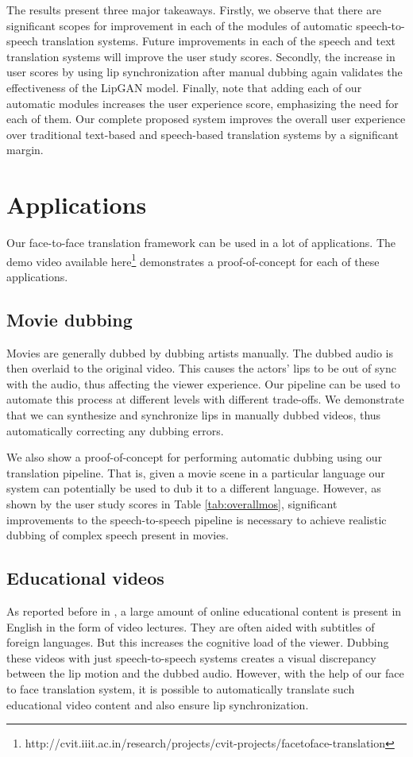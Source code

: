 \documentclass[sigconf]{acmart}
\begin{document}
The results present three major takeaways. Firstly, we observe that there are significant scopes for improvement in each of the modules of automatic speech-to-speech translation systems. Future improvements in each of the speech and text translation systems will improve the user study scores. Secondly, the increase in user scores by using lip synchronization after manual dubbing again validates the effectiveness of the LipGAN model. Finally, note that adding each of our automatic modules increases the user experience score, emphasizing the need for each of them. Our complete proposed system improves the overall user experience over traditional text-based and speech-based translation systems by a significant margin.

\section{Applications}
\label{section:applications}
Our face-to-face translation framework can be used in a lot of applications. The demo video available here\footnote{http://cvit.iiit.ac.in/research/projects/cvit-projects/facetoface-translation} demonstrates a proof-of-concept for each of these applications.

\vspace{-5pt}
\subsection{Movie dubbing} Movies are generally dubbed by dubbing artists manually. The dubbed audio is then overlaid to the original video. This causes the actors' lips to be out of sync with the audio, thus affecting the viewer experience. Our pipeline can be used to automate this process at different levels with different trade-offs. We demonstrate that we can synthesize and synchronize lips in manually dubbed videos, thus automatically correcting any dubbing errors.

We also show a proof-of-concept for performing automatic dubbing using our translation pipeline. That is, given a movie scene in a particular language our system can potentially be used to dub it to a different language. However, as shown by the user study scores in Table \ref{tab:overallmos}, significant improvements to the speech-to-speech pipeline is necessary to achieve realistic dubbing of complex speech present in movies. 

\subsection{Educational videos} As reported before in \cite{crosslanguage}, a large amount of online educational content is present in English in the form of video lectures. They are often aided with subtitles of foreign languages. But this increases the cognitive load of the viewer. Dubbing these videos with just speech-to-speech systems creates a visual discrepancy between the lip motion and the dubbed audio. However, with the help of our face to face translation system, it is possible to automatically translate such educational video content and also ensure lip synchronization.
\end{document}

